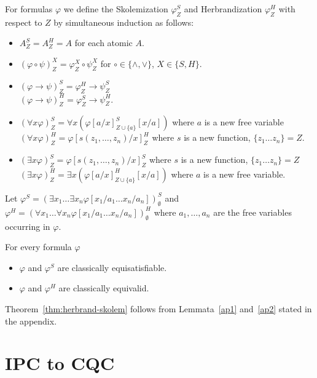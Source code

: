 \documentclass[runningheads]{llncs}
\begin{document}
\begin{definition}
	For formulas $\varphi$ we define the Skolemization $\varphi^S_Z$ and Herbrandization $\varphi^H_Z$ with respect to $Z$ by simultaneous induction as follows:
	\begin{itemize}
		\item $A^S_Z = A^H_Z = A$ for each atomic $A$.
		\item $(\varphi\circ\psi)^X_Z = \varphi^X_Z\circ\psi^X_Z$ for $\circ\in\{\wedge, \vee\}$, $X\in\{S, H\}$.
		\item $(\varphi\to\psi)^S_Z = \varphi^H_Z\to \psi^S_Z$\\$(\varphi\to\psi)^H_Z = \varphi^S_Z\to\psi^H_Z$.
		\item $(\forall x\varphi)^S_Z = \forall x(\varphi[a/x]^S_{Z\cup\{a\}}[x/a])$ where $a$ is a new free variable\\$(\forall x\varphi)^H_Z = \varphi[s(z_1,\dots,z_n)/x]^H_Z$ where $s$ is a new function, $\{z_1\dots z_n\} = Z$.
		\item $(\exists x\varphi)^S_Z = \varphi[s(z_1,\dots,z_n)/x]^S_Z$ where $s$ is a new function, $\{z_1\dots z_n\} = Z$\\$(\exists x\varphi)^H_Z = \exists x(\varphi[a/x]^H_{Z\cup\{a\}}[x/a])$ where $a$ is a new free variable.
	\end{itemize}
	Let $\varphi^S = (\exists x_1\dots\exists x_n \varphi[x_1/a_1\dots x_n/a_n])^S_\emptyset$ and $\varphi^H = (\forall x_1\dots\forall x_n \varphi[x_1/a_1\dots x_n/a_n])^H_\emptyset$ where $a_1,\dots,a_n$ are the free variables occurring in $\varphi$.
\end{definition}

\begin{theorem}
\label{thm:herbrand-skolem}
For every formula $\varphi$
	\begin{itemize}
		\item $\varphi$ and $\varphi^S$ are classically equisatisfiable.
		\item $\varphi$ and $\varphi^H$ are classically equivalid.
	\end{itemize}
\end{theorem}

Theorem~\ref{thm:herbrand-skolem} follows from Lemmata~\ref{ap1} and~\ref{ap2} stated in the appendix.


\section{IPC to CQC}
\end{document}
